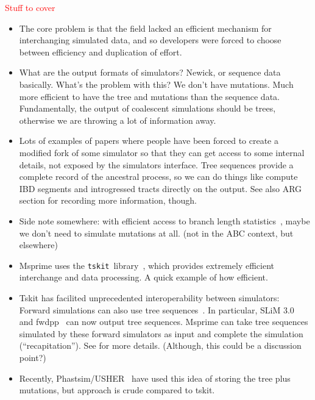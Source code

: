 \documentclass{article}
\newcommand{\tskit}[0]{\texttt{tskit}}
\newcommand{\jkcomment}[1]{\textcolor{red}{#1}}
\begin{document}
\jkcomment{Stuff to cover}
\begin{itemize}

\item The core problem is that the field lacked an efficient mechanism for
    interchanging simulated data, and so developers were forced to choose
    between efficiency and duplication of effort.

\item What are the output formats of simulators? Newick, or sequence data
    basically. What's the problem with this? We don't have mutations.
    Much more efficient to have the tree and mutations than the
    sequence data. Fundamentally, the output of coalescent simulations
    should be trees, otherwise we are throwing a lot of information
    away.

\item Lots of examples of papers where people have been forced to
    create a modified fork of some simulator so that they can get
    access to some internal details, not exposed by the simulators
    interface. Tree sequences provide a complete record of the
    ancestral process, so we can do things like compute IBD
    segments and introgressed tracts directly on the output. See
    also ARG section for recording more information, though.

\item Side note somewhere: with efficient access to branch length
    statistics~\citep{ralph2019efficiently}, maybe we don't need to
    simulate mutations at all. (not in the ABC context, but elsewhere)

\item Msprime uses the \tskit\ library~\citep{tskit2021tskit}, which provides
    extremely efficient interchange and data processing. A quick example
    of how efficient.

\item Tskit has facilited unprecedented interoperability between simulators:
    Forward simulations can also use tree
    sequences~\citep{kelleher2018efficient,haller2018tree}. In particular, SLiM
    3.0~\citep{haller2019slim} and fwdpp~\citep{thornton2014cpp} can now output
    tree sequences. Msprime can take tree sequences simulated by these forward
    simulators as input and complete the simulation (``recapitation'').
    See \cite{haller2018tree} for more details.
    (Although, this could be a discussion point?)

\item Recently, Phastsim/USHER~\cite{demaio2021phastsim,turakhia2021ultrafast}
    have used this idea of storing the
    tree plus mutations, but approach is crude compared to tskit.

\end{itemize}
\end{document}
